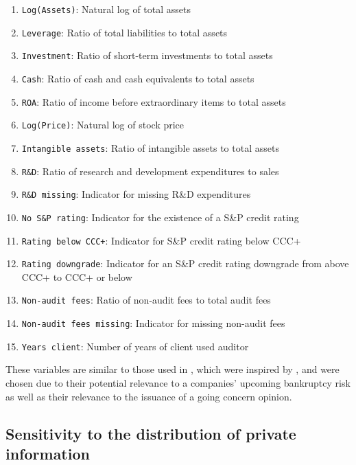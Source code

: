 \documentclass[aoas,preprint, 11pt, dvipsnames, table, x11name]{imsart}
\theoremstyle{remark}
\begin{document}
	\small 
	\begin{enumerate}\label{covariates}
		\itemsep0em 
		\item {\tt Log(Assets)}: Natural log of total assets
		\item {\tt Leverage}: Ratio of total liabilities to total assets
		\item {\tt Investment}: Ratio of short-term investments to total assets
		\item {\tt Cash}: Ratio of cash and cash equivalents to total assets
		\item {\tt ROA}: Ratio of income before extraordinary items to total assets
		\item {\tt Log(Price)}:  Natural log of stock price
		\item {\tt Intangible assets}: Ratio of intangible assets to total assets
		\item {\tt R\&D}: Ratio of research and development expenditures to sales
		\item {\tt R\&D missing}: Indicator for missing R\&D expenditures
		\item {\tt No S\&P rating}: Indicator for the existence of a S\&P credit rating
		\item {\tt Rating below CCC+}: Indicator for S\&P credit rating below CCC+
		\item {\tt Rating downgrade}: Indicator for an S\&P credit rating downgrade from above CCC+ to CCC+ or below
		\item {\tt Non-audit fees}: Ratio of non-audit fees to total audit fees
		\item {\tt  Non-audit fees missing}: Indicator for missing non-audit fees
		\item {\tt Years client}: Number of years of client used auditor
	\end{enumerate}
	\normalsize
	These variables are similar to those used in \cite{paper}, which were inspired by \cite{defond-2002}, and were chosen due to their potential relevance to a companies' upcoming bankruptcy risk as well as their relevance to the issuance of a going concern opinion. 
	
	\subsection{Sensitivity to the distribution of private information}\label{sens_analysis}
	
\end{document}
